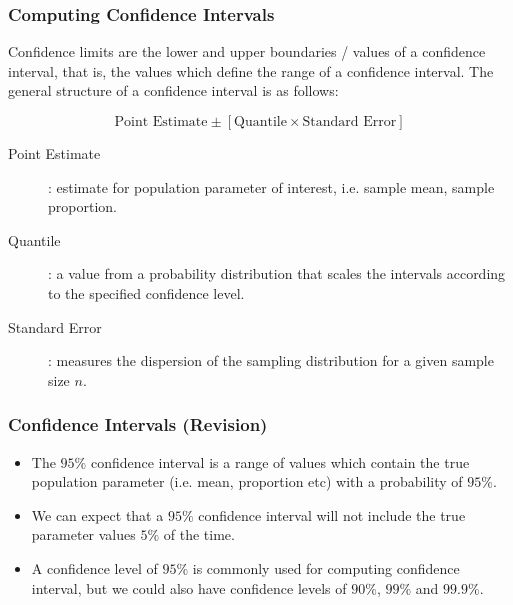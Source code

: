 

\begin{frame}
\frametitle{Computing Confidence Intervals}
Confidence limits are the lower and upper boundaries / values of a confidence interval, that is, the values which define the range of a confidence interval. The general structure of a confidence interval is as follows:

\[ \mbox{Point Estimate}  \pm \left[ \mbox{Quantile} \times \mbox{Standard Error} \right] \]


\begin{description}
\item[Point Estimate]: estimate for population parameter of interest, i.e. sample mean, sample proportion.
\item[Quantile]: a value from a probability distribution that scales the intervals according to the specified confidence level.
\item[Standard Error]: measures the dispersion of the sampling distribution for a given sample size $n$.
\end{description}
\end{frame}





\begin{frame}
\frametitle{Confidence Intervals (Revision) }

\begin{itemize}
\item The $95\%$ confidence interval is a range of values which contain the true population parameter (i.e. mean, proportion etc) with a probability of $95\%$.
\item We can expect that a $95\%$ confidence interval will not include the true parameter values $5\%$ of the time.
\item A confidence level of $95\%$ is commonly used for computing confidence interval, but we could also have confidence levels of $90\%$, $99\%$ and $99.9\%$.
\end{itemize}

\end{frame}



